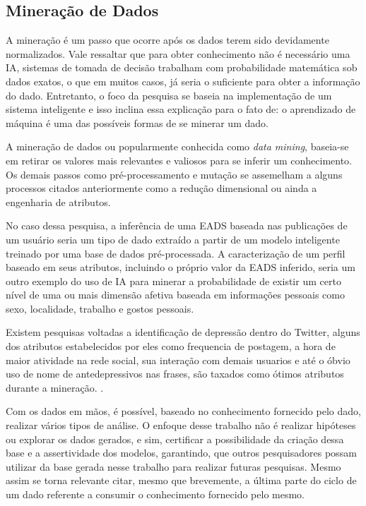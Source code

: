 \subsection{Mineração de Dados}
A mineração é um passo que ocorre após os dados terem sido devidamente normalizados. Vale ressaltar que para obter conhecimento não é necessário uma IA, sistemas de tomada de decisão trabalham com probabilidade matemática sob dados exatos, o que em muitos casos, já seria o suficiente para obter a informação do dado. Entretanto, o foco da pesquisa se baseia na implementação de um sistema inteligente e isso inclina essa explicação para o fato de: o aprendizado de máquina é uma das possíveis formas de se minerar um dado.

A mineração de dados ou popularmente conhecida como \textit{data mining}, baseia-se em retirar os valores mais relevantes e valiosos para se inferir um conhecimento. Os demais passos como pré-processamento e mutação se assemelham a alguns processos citados anteriormente como a redução dimensional ou ainda a engenharia de atributos.

No caso dessa pesquisa, a inferência de uma EADS baseada nas publicações de um usuário seria um tipo de dado extraído a partir de um modelo inteligente treinado por uma base de dados pré-processada. A caracterização de um perfil baseado em seus atributos, incluindo o próprio valor da EADS inferido, seria um outro exemplo do uso de IA para minerar a probabilidade de existir um certo nível de uma ou mais dimensão afetiva baseada em informações pessoais como sexo, localidade, trabalho e gostos pessoais.

Existem pesquisas voltadas a identificação de depressão dentro do Twitter, alguns dos atributos estabelecidos por eles como frequencia de postagem, a hora de maior atividade na rede social, sua interação com demais usuarios e até o óbvio uso de nome de antedepressivos nas frases, são taxados como ótimos atributos durante a mineração. \cite{de2013social, de2013predicting, tsugawa2015recognizing, yang2015gis}.

Com os dados em mãos, é possível, baseado no conhecimento fornecido pelo dado, realizar vários tipos de análise. O enfoque desse trabalho não é realizar hipóteses ou explorar os dados gerados, e sim, certificar a possibilidade da criação dessa base e a assertividade dos modelos, garantindo, que outros pesquisadores possam utilizar da base gerada nesse trabalho para realizar futuras pesquisas. Mesmo assim se torna relevante citar, mesmo que brevemente, a última parte do ciclo de um dado referente a consumir o conhecimento fornecido pelo mesmo.
